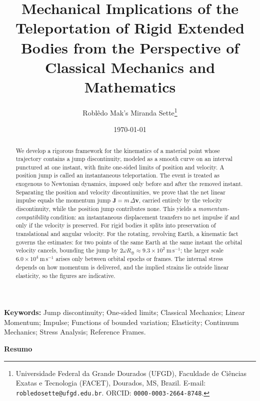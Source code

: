 \documentclass[11pt]{article}
\title{\bf Mechanical Implications of the Teleportation of
	Rigid Extended Bodies from the Perspective of Classical
	Mechanics and Mathematics}
\author{
	Roblêdo Mak's Miranda Sette\thanks{%
		Universidade Federal da Grande Dourados (UFGD), Faculdade de
		Ciências Exatas e Tecnologia (FACET), Dourados, MS, Brazil.
		E-mail: \texttt{robledosette@ufgd.edu.br}. ORCID: \texttt{0000-0003-2664-8748}.}
}
\date{\today}
\begin{document}
	
	\maketitle
	
	\begin{abstract}
		We develop a rigorous framework for the kinematics of a material
		point whose trajectory contains a jump discontinuity, modeled as a
		smooth curve on an interval punctured at one instant, with finite
		one-sided limits of position and velocity. A position jump is
		called an instantaneous teleportation. The event is treated as
		exogenous to Newtonian dynamics, imposed only before and after the
		removed instant. Separating the position and velocity
		discontinuities, we prove that the net linear impulse equals the
		momentum jump $\mathbf J=m\,\Delta\mathbf v$, carried entirely by
		the velocity discontinuity, while the position jump contributes
		none. This yields a \emph{momentum-compatibility} condition: an
		instantaneous displacement transfers no net impulse if and only if
		the velocity is preserved. For rigid bodies it splits into
		preservation of translational and angular velocity. For the
		rotating, revolving Earth, a kinematic fact governs the estimates:
		for two points of the same Earth at the same instant the orbital
		velocity cancels, bounding the jump by $2\omega R_{\oplus}\approx
		9.3\times10^{2}\ \mathrm{m\,s^{-1}}$; the larger scale
		$6.0\times10^{4}\ \mathrm{m\,s^{-1}}$ arises only between orbital
		epochs or frames. The internal stress depends on how momentum is
		delivered, and the implied strains lie outside linear elasticity,
		so the figures are indicative.
	\end{abstract}
	
	\noindent
	\textbf{Keywords:}
	Jump discontinuity;
	One-sided limits;
	Classical Mechanics;
	Linear Momentum;
	Impulse;
	Functions of bounded variation;
	Elasticity;
	Continuum Mechanics;
	Stress Analysis;
	Reference Frames.
	
	\vspace{0.6cm}
	
	\begin{center}
		\textbf{\large Resumo}
	\end{center}
	
\end{document}
